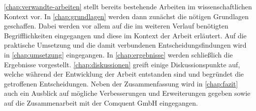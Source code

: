\autoref{chap:verwandte-arbeiten} stellt bereits bestehende Arbeiten im wissenschaftlichen Kontext vor. In \autoref{chap:grundlagen} werden dann zunächst die nötigen Grundlagen geschaffen. Dabei werden vor allem auf die im weiteren Verlauf benötigten Begrifflichkeiten eingegangen und diese im Kontext der Arbeit erläutert. Auf die praktische Umsetzung und die damit verbundenen Entscheidungsfindungen wird in \autoref{chap:umsetzung} eingegangen. In \autoref{chap:ergebnisse} werden schließlich die Ergebnisse vorgestellt. \autoref{chap:diskussionen} greift einige Diskussionspunkte auf, welche während der Entwicklung der Arbeit entstanden sind und begründet die getroffenen Entscheidungen. Neben der Zusammenfassung wird in \autoref{chap:fazit} auch ein Ausblick auf mögliche Verbesserungen und Erweiterungen gegeben sowie auf die Zusammenarbeit mit der Comquent GmbH eingegangen.


